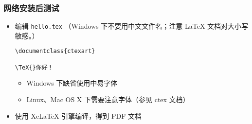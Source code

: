 



\begin{frame}[fragile]
  \frametitle{网络安装后测试}

  \begin{itemize}
    \item 编辑 \texttt{hello.tex} （Windows 下不要用中文文件名；注意
      \LaTeX{} 文档对大小写敏感。）
      \lstset{language=[LaTeX]TeX}
      \begin{card} \begin{lstlisting}[basicstyle=\ttfamily]
\documentclass{ctexart}

\TeX{}你好！

        \end{lstlisting}\end{card}
      \begin{itemize}
        \item Windows 下缺省使用中易字体
        \item Linux、Mac OS X 下需要注意字体（参见 ctex 文档）
      \end{itemize}
    \item 使用 XeLaTeX 引擎编译，得到 PDF 文档
      \begin{center}
      \end{center}
  \end{itemize}
\end{frame}

